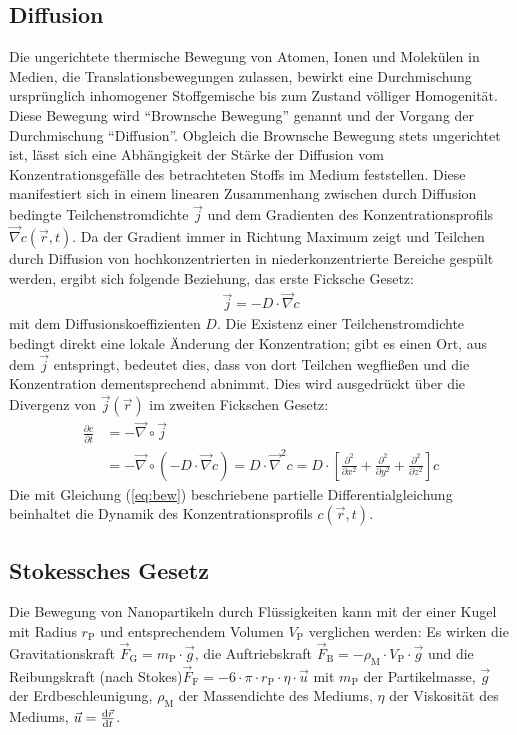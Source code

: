 \documentclass[numbers=noenddot,12pt,a4paper]{scrartcl}
\newcommand{\diff}{\textnormal{d}}
\newcommand{\ix}[1]{_\text{#1}}
\begin{document}
\subsection{Diffusion}
Die ungerichtete thermische Bewegung von Atomen, Ionen und Molekülen in Medien, die Translationsbewegungen zulassen, bewirkt eine Durchmischung ursprünglich inhomogener Stoffgemische bis zum Zustand völliger Homogenität. Diese Bewegung wird "`Brownsche Bewegung"' genannt und der Vorgang der Durchmischung "`Diffusion"'. Obgleich die Brownsche Bewegung stets ungerichtet ist, lässt sich eine Abhängigkeit der Stärke der Diffusion vom Konzentrationsgefälle des betrachteten Stoffs im Medium feststellen. Diese manifestiert sich in einem linearen Zusammenhang zwischen durch Diffusion bedingte Teilchenstromdichte $\vec{j}$ und dem Gradienten des Konzentrationsprofils $\vec{\nabla} c(\vec{r},t)$. Da der Gradient immer in Richtung Maximum zeigt und Teilchen durch Diffusion von hochkonzentrierten in niederkonzentrierte Bereiche gespült werden, ergibt sich folgende Beziehung, das erste Ficksche Gesetz:
\begin{align}\label{eq:grad}
\vec{j}=-D\cdot\vec{\nabla}c
\end{align}
mit dem Diffusionskoeffizienten $D$. Die Existenz einer Teilchenstromdichte bedingt direkt eine lokale Änderung der Konzentration; gibt es einen Ort, aus dem $\vec{j}$ entspringt, bedeutet dies, dass von dort Teilchen wegfließen und die Konzentration dementsprechend abnimmt. Dies wird ausgedrückt über die Divergenz von $\vec{j}\left(\vec{r}\right)$ im zweiten Fickschen Gesetz:
\begin{align}
\frac{\partial c}{\partial t}&=-\vec{\nabla}\circ\vec{j}\\
&=-\vec{\nabla}\circ(-D\cdot\vec{\nabla} c)=D\cdot\vec{\nabla}^2c=D\cdot\left[\frac{\partial^2}{\partial x^2}+\frac{\partial^2}{\partial y^2}+\frac{\partial^2}{\partial z^2}\right]c\label{eq:bew}
\end{align}
Die mit Gleichung (\ref{eq:bew}) beschriebene partielle Differentialgleichung beinhaltet die Dynamik des Konzentrationsprofils $c(\vec{r},t)$.
\subsection{Stokessches Gesetz}
Die Bewegung von Nanopartikeln durch Flüssigkeiten kann mit der einer Kugel mit Radius $r\ix{P}$ und entsprechendem Volumen $V\ix{P}$ verglichen werden: Es wirken die Gravitationskraft $\vec{F}\ix{G}=m\ix{P}\cdot\vec{g}$, die Auftriebskraft $\vec{F}\ix{B}=-\rho\ix{M}\cdot V\ix{P}\cdot\vec{g}$ und die Reibungskraft (nach Stokes)\linebreak$\vec{F}\ix{F}=-6\cdot\pi\cdot r\ix{P}\cdot\eta\cdot\vec{u}$ mit $m\ix{P}$ der Partikelmasse, $\vec{g}$ der Erdbeschleunigung, $\rho\ix{M}$ der Massendichte des Mediums, $\eta$ der Viskosität des Mediums, $\vec{u}=\frac{\diff \vec{r}}{\diff t}$.
\end{document}
